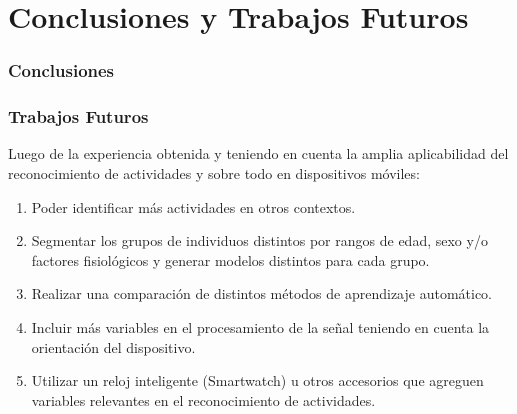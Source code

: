 \chapter{Conclusiones y Trabajos
Futuros}\label{conclusiones-y-trabajos-futuros}

\subsection{Conclusiones}\label{conclusiones}


\subsection{Trabajos Futuros}\label{trabajos-futuros}

Luego de la experiencia obtenida y teniendo en cuenta la amplia
aplicabilidad del reconocimiento de actividades y sobre todo en
dispositivos móviles:

\begin{enumerate}
\item
  Poder identificar más actividades en otros contextos.
\item
  Segmentar los grupos de individuos distintos por rangos de edad, sexo y/o
  factores fisiológicos y generar modelos distintos para cada grupo.
\item
  Realizar una comparación de distintos métodos de aprendizaje
  automático.
\item
  Incluir más variables en el procesamiento de la señal teniendo en cuenta la 
  orientación del dispositivo.
\item
  Utilizar un reloj inteligente (Smartwatch) u otros accesorios que agreguen 
  variables relevantes en el reconocimiento de actividades.
\end{enumerate}
